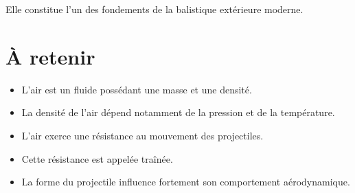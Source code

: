 Elle constitue l'un des fondements de la balistique extérieure moderne.

\section{À retenir}

\begin{aretenir}

\begin{itemize}
\item L'air est un fluide possédant une masse et une densité.
\item La densité de l'air dépend notamment de la pression et de la
température.
\item L'air exerce une résistance au mouvement des projectiles.
\item Cette résistance est appelée traînée.
\item La forme du projectile influence fortement son comportement
aérodynamique.
\end{itemize}

\end{aretenir}

